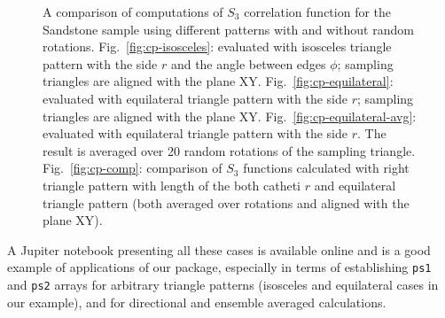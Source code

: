\documentclass[reprint,amsmath,amssymb,aps,pre,showkeys,showpacs]{revtex4-1}
\newcommand{\code}[1]{\colorbox{light-gray}{\texttt{#1}}}
\begin{document}
\begin{figure}[ht]
{    \label{fig:cp-comp}}
  \caption[]{A comparison of computations of $S_3$ correlation function for the
    Sandstone sample using different patterns with and without random
    rotations. Fig.~\ref{fig:cp-isosceles}: evaluated with isosceles triangle
    pattern with the side $r$ and the angle between edges $\phi$; sampling
    triangles are aligned with the plane XY. Fig.~\ref{fig:cp-equilateral}:
    evaluated with equilateral triangle pattern with the side $r$; sampling
    triangles are aligned with the plane XY. Fig.~\ref{fig:cp-equilateral-avg}:
    evaluated with equilateral triangle pattern with the side $r$. The result is
    averaged over 20 random rotations of the sampling
    triangle. Fig.~\ref{fig:cp-comp}: comparison of $S_3$ functions calculated
    with right triangle pattern with length of the both catheti $r$ and
    equilateral triangle pattern (both averaged over rotations and aligned with
    the plane XY).}
  \label{fig:comparison-patterns}
\end{figure}

A Jupiter notebook presenting all these cases is available online
\cite{Repo_example} and is a good example of applications of our package,
especially in terms of establishing \code{ps1} and \code{ps2} arrays for
arbitrary triangle patterns (isosceles and equilateral cases in our example),
and for directional and ensemble averaged calculations.
\end{document}
